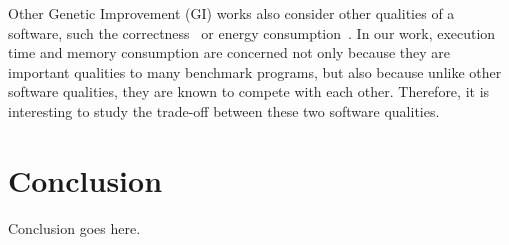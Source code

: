 \documentclass[oribibl]{llncs}
\begin{document}
Other Genetic Improvement (GI) works also consider other qualities of a software, such the correctness~\cite{6035728} or energy consumption~\cite{Bruce:2015:REC:2739480.2754752}.
In our work, execution time and memory consumption are concerned not only because they are important qualities to many benchmark programs, but also because unlike other software qualities, they are known to compete with each other.
Therefore, it is interesting to study the trade-off between these two software qualities.

\section{Conclusion}
\label{sec_conclusion}

Conclusion goes here.


   
\end{document}
